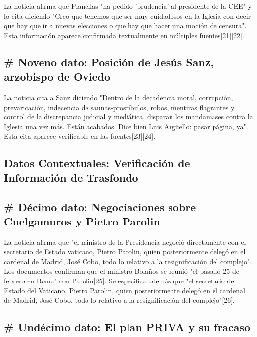 \documentclass[10pt,a4paper]{article}
\begin{document}
 La noticia afirma que Planellas "ha pedido 'prudencia' al presidente de la CEE" y lo cita diciendo "Creo que tenemos que ser muy cuidadosos en la Iglesia con decir que hay que ir a nuevas elecciones o que hay que hacer una moci\'{o}n de censura". Esta informaci\'{o}n aparece confirmada textualmente en m\'{u}ltiples fuentes[21][22]. 

\subsection*{\# Noveno dato: Posici\'{o}n de Jes\'{u}s Sanz, arzobispo de Oviedo}

 La noticia cita a Sanz diciendo "Dentro de la decadencia moral, corrupci\'{o}n, prevaricaci\'{o}n, indecencia de saunas-prost\'{i}bulos, robos, mentiras flagrantes y control de la discrepancia judicial y medi\'{a}tica, disparan los mandamases contra la Iglesia una vez m\'{a}s. Est\'{a}n acabados. Dice bien Luis Arg\"{u}ello: pasar p\'{a}gina, ya". Esta cita aparece verificable en las fuentes[23][24]. 

\subsection*{Datos Contextuales: Verificaci\'{o}n de Informaci\'{o}n de Trasfondo}



\subsection*{\# D\'{e}cimo dato: Negociaciones sobre Cuelgamuros y Pietro Parolin}

 La noticia afirma que "el ministro de la Presidencia negoci\'{o} directamente con el secretario de Estado vaticano, Pietro Parolin, quien posteriormente deleg\'{o} en el cardenal de Madrid, Jos\'{e} Cobo, todo lo relativo a la resignificaci\'{o}n del complejo". Los documentos confirman que el ministro Bola\~{n}os se reuni\'{o} "el pasado 25 de febrero en Roma" con Parolin[25]. Se especifica adem\'{a}s que "el secretario de Estado del Vaticano, Pietro Parolin, quien posteriormente deleg\'{o} en el cardenal de Madrid, Jos\'{e} Cobo, todo lo relativo a la resignificaci\'{o}n del complejo"[26]. 

\subsection*{\# Und\'{e}cimo dato: El plan PRIVA y su fracaso}
\end{document}
